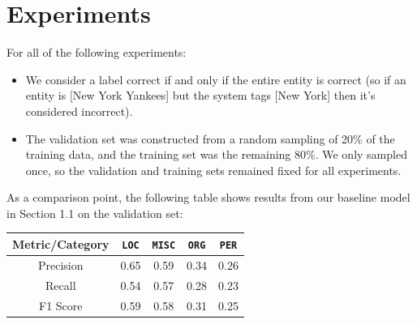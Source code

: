 \documentclass[12pt]{article}
\begin{document}
\section{Experiments}
For all of the following experiments:
\begin{itemize}
	\item We consider a label correct if and only if the entire entity is correct (so if an entity is [New York Yankees] but the system tags [New York] then it's considered incorrect).
	\item The validation set was constructed from a random sampling of 20\% of the training data, and the training set was the remaining 80\%. We only sampled once, so the validation and training sets remained fixed for all experiments.
\end{itemize}
As a comparison point, the following table shows results from our baseline model in Section 1.1 on the validation set:
\begin{center}
	\begin{tabular}{|c|c|c|c|c|}
		\hline
		\textbf{Metric/Category} & {\tt LOC} & {\tt MISC} & {\tt ORG} & {\tt PER}\\
		\hline
		Precision & 0.65 & 0.59 & 0.34 & 0.26\\
		\hline
		Recall & 0.54 & 0.57 & 0.28 & 0.23\\
		\hline
		F1 Score & 0.59 & 0.58 & 0.31 & 0.25\\
		\hline
	\end{tabular}
\end{center}
\end{document}
